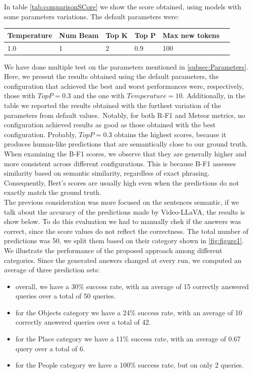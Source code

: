 \documentclass[10pt,twocolumn,letterpaper]{article}
\begin{document}
In table \ref{tab:comparisonSCore} we show the score obtained, using models with some parameters variations.
The default parameters were:

\begin{table}[h]
\centering
\scriptsize
\label{tab:performance}
\begin{tabular}{@{}p{1.2cm}p{1.0cm}p{1.0cm}p{1.0cm}p{1.0cm}p{1.5cm}@{}}
\toprule
Temperature & Num Beam & Top K & Top P & Max new tokens \\ \midrule
1.0 & 1 & 2 & 0.9 & 100 \\ 
\bottomrule
\end{tabular}
\captionsetup{font=footnotesize}
\end{table}

We have done multiple test on the parameters mentioned in \ref{subsec:Parameters}. Here, we present the results obtained using the default parameters, the configuration that achieved the best and worst performances were, respectively, those with $Top P = 0.3$ and the one with $Temperature = 10$. Additionally, in the table we reported the results obtained with the furthest variation of the parameters from default values.\
Notably, for both R-F1 and Meteor metrics, no configuration achieved results as good as those obtained with the best configuration. Probably, $Top P = 0.3$ obtains the highest scores, because it produces human-like predictions that are semantically close to our ground truth. When examining the B-F1 scores, we observe that they are generally higher and more consistent across different configurations. This is because B-F1 assesses similarity based on semantic similarity, regardless of exact phrasing. Consequently, Bert's scores are usually high even when the predictions do not exactly match the ground truth.
\\
The previous consideration was more focused on the sentences semantic, if we talk about the accuracy of the predictions made by Video-LLaVA, the results is show below. To do this evaluation we had to manually chek if the answers was correct, since the score values do not reflect the correctness. The total number of predictions was 50, we split them based on their category shown in \ref{fig:figure1}. We illustrate the performance of the proposed approach among different categories.
Since the generated answers changed at every run, we computed an average of three prediction sets:

\begin{itemize}
\itemsep=0.1cm  
\small
    \item overall, we have a 30\% success rate, with an average of 15 correctly answered queries over a total of 50 queries.
    \item for the Objects category we have a 24\% success rate, with an average of 10 correctly answered queries over a total of 42.
    \item for the Place category we have a 11\% success rate, with an average of 0.67 query over a total of 6.
    \item for the People category we have a 100\% success rate, but on only 2 queries.   
\end{itemize}
\end{document}
